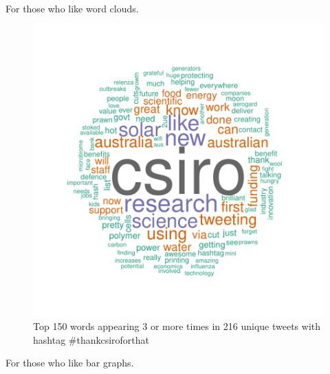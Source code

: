 \documentclass[a4paper,10pt]{article}
\begin{document}

For those who like word clouds.

\begin{figure}[h]
\begin{center}
\includegraphics[scale=0.55]{thankCSIROjson-cloud.pdf}
\caption{Top 150 words appearing 3 or more times in 216 unique tweets with hashtag \#thankcsiroforthat}
\end{center}
\end{figure}


\noindent For those who like bar graphs.
\end{document}

